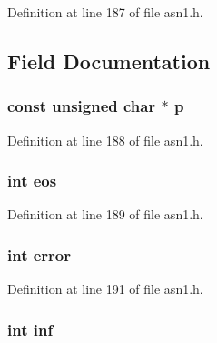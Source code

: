 Definition at line 187 of file asn1.\+h.



\subsection{Field Documentation}
\subsubsection[{\texorpdfstring{p}{p}}]{\setlength{\rightskip}{0pt plus 5cm}const unsigned char $\ast$ p}\hypertarget{structasn1__const__ctx__st_ae329a214f7e2e08dfa26a10e01466df9}{}\label{structasn1__const__ctx__st_ae329a214f7e2e08dfa26a10e01466df9}


Definition at line 188 of file asn1.\+h.

\subsubsection[{\texorpdfstring{eos}{eos}}]{\setlength{\rightskip}{0pt plus 5cm}int eos}\hypertarget{structasn1__const__ctx__st_a361b5c8443971a7dbab5f334babedaed}{}\label{structasn1__const__ctx__st_a361b5c8443971a7dbab5f334babedaed}


Definition at line 189 of file asn1.\+h.

\subsubsection[{\texorpdfstring{error}{error}}]{\setlength{\rightskip}{0pt plus 5cm}int error}\hypertarget{structasn1__const__ctx__st_a11614f44ef4d939bdd984953346a7572}{}\label{structasn1__const__ctx__st_a11614f44ef4d939bdd984953346a7572}


Definition at line 191 of file asn1.\+h.

\subsubsection[{\texorpdfstring{inf}{inf}}]{\setlength{\rightskip}{0pt plus 5cm}int inf}\hypertarget{structasn1__const__ctx__st_a0726229cd75e3b3be1d6e3c8fccacb87}{}\label{structasn1__const__ctx__st_a0726229cd75e3b3be1d6e3c8fccacb87}



